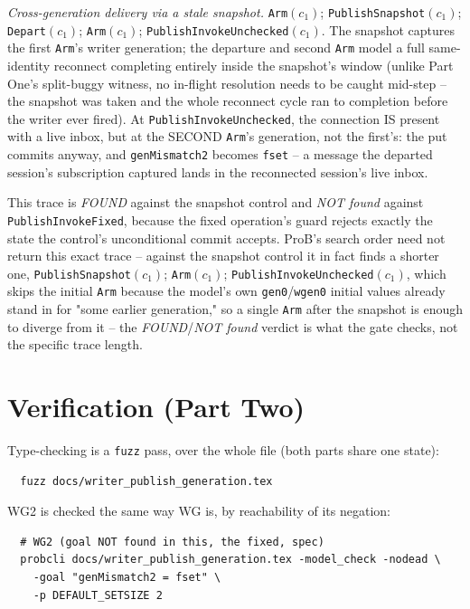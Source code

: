 \documentclass[a4paper,10pt,fleqn]{article}
\begin{document}
\emph{Cross-generation delivery via a stale snapshot.}
\texttt{Arm}$(c_1)$; \texttt{PublishSnapshot}$(c_1)$; \texttt{Depart}$(c_1)$;
\texttt{Arm}$(c_1)$; \texttt{PublishInvokeUnchecked}$(c_1)$. The snapshot
captures the first \texttt{Arm}'s writer generation; the departure and
second \texttt{Arm} model a full same-identity reconnect completing entirely
inside the snapshot's window (unlike Part One's split-buggy witness, no
in-flight resolution needs to be caught mid-step -- the snapshot was taken
and the whole reconnect cycle ran to completion before the writer ever
fired). At \texttt{PublishInvokeUnchecked}, the connection IS present with a
live inbox, but at the SECOND \texttt{Arm}'s generation, not the first's:
the put commits anyway, and \texttt{genMismatch2} becomes \texttt{fset} -- a
message the departed session's subscription captured lands in the
reconnected session's live inbox.

This trace is \emph{FOUND} against the snapshot control and \emph{NOT found}
against \texttt{PublishInvokeFixed}, because the fixed operation's guard
rejects exactly the state the control's unconditional commit accepts. ProB's
search order need not return this exact trace -- against the snapshot control
it in fact finds a shorter one, \texttt{PublishSnapshot}$(c_1)$;
\texttt{Arm}$(c_1)$; \texttt{PublishInvokeUnchecked}$(c_1)$, which skips the
initial \texttt{Arm} because the model's own \texttt{gen0}/\texttt{wgen0}
initial values already stand in for "some earlier generation," so a single
\texttt{Arm} after the snapshot is enough to diverge from it -- the
\emph{FOUND}/\emph{NOT found} verdict is what the gate checks, not the
specific trace length.

\section{Verification (Part Two)}
\label{sec:verify2}

Type-checking is a \texttt{fuzz} pass, over the whole file (both parts share
one state):
\begin{verbatim}
  fuzz docs/writer_publish_generation.tex
\end{verbatim}

WG2 is checked the same way WG is, by reachability of its negation:

\begin{verbatim}
  # WG2 (goal NOT found in this, the fixed, spec)
  probcli docs/writer_publish_generation.tex -model_check -nodead \
    -goal "genMismatch2 = fset" \
    -p DEFAULT_SETSIZE 2
\end{verbatim}
\end{document}
